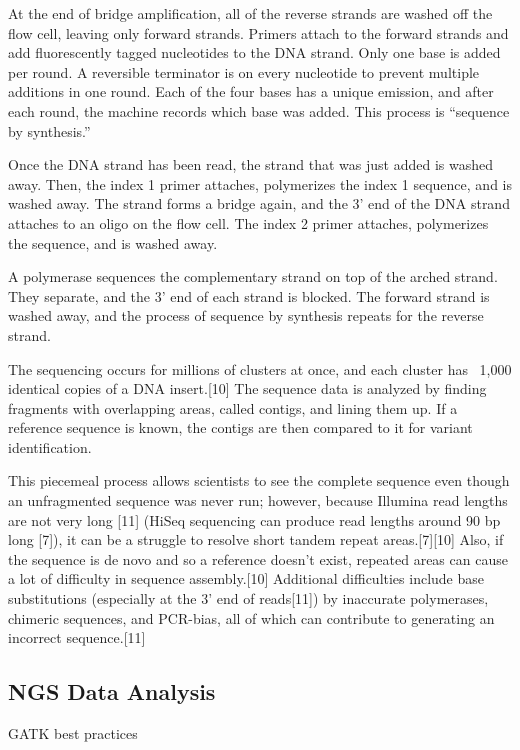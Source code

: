 At the end of bridge amplification, all of the reverse strands are washed off the flow cell, leaving only forward strands. Primers attach to the forward strands and add fluorescently tagged nucleotides to the DNA strand. Only one base is added per round. A reversible terminator is on every nucleotide to prevent multiple additions in one round. Each of the four bases has a unique emission, and after each round, the machine records which base was added. This process is “sequence by synthesis.”

Once the DNA strand has been read, the strand that was just added is washed away. Then, the index 1 primer attaches, polymerizes the index 1 sequence, and is washed away. The strand forms a bridge again, and the 3’ end of the DNA strand attaches to an oligo on the flow cell. The index 2 primer attaches, polymerizes the sequence, and is washed away.

A polymerase sequences the complementary strand on top of the arched strand. They separate, and the 3’ end of each strand is blocked. The forward strand is washed away, and the process of sequence by synthesis repeats for the reverse strand.

The sequencing occurs for millions of clusters at once, and each cluster has ~1,000 identical copies of a DNA insert.[10] The sequence data is analyzed by finding fragments with overlapping areas, called contigs, and lining them up. If a reference sequence is known, the contigs are then compared to it for variant identification.

This piecemeal process allows scientists to see the complete sequence even though an unfragmented sequence was never run; however, because Illumina read lengths are not very long [11] (HiSeq sequencing can produce read lengths around 90 bp long [7]), it can be a struggle to resolve short tandem repeat areas.[7][10] Also, if the sequence is de novo and so a reference doesn’t exist, repeated areas can cause a lot of difficulty in sequence assembly.[10] Additional difficulties include base substitutions (especially at the 3’ end of reads[11]) by inaccurate polymerases, chimeric sequences, and PCR-bias, all of which can contribute to generating an incorrect sequence.[11]



\subsection{NGS Data Analysis}

GATK best practices

